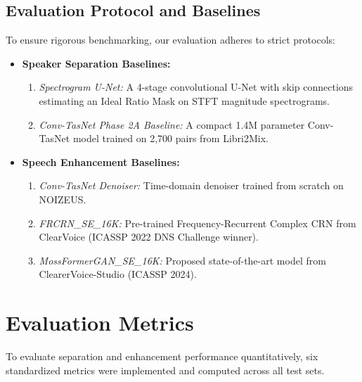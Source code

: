 \documentclass[11pt,a4paper]{report}
\begin{document}
\section{Evaluation Protocol and Baselines}
To ensure rigorous benchmarking, our evaluation adheres to strict protocols:
\begin{itemize}
    \item \textbf{Speaker Separation Baselines:}
    \begin{enumerate}
        \item \textit{Spectrogram U-Net:} A 4-stage convolutional U-Net with skip connections estimating an Ideal Ratio Mask on STFT magnitude spectrograms.
        \item \textit{Conv-TasNet Phase 2A Baseline:} A compact 1.4M parameter Conv-TasNet model trained on 2,700 pairs from Libri2Mix.
    \end{enumerate}
    \item \textbf{Speech Enhancement Baselines:}
    \begin{enumerate}
        \item \textit{Conv-TasNet Denoiser:} Time-domain denoiser trained from scratch on NOIZEUS.
        \item \textit{FRCRN\_SE\_16K:} Pre-trained Frequency-Recurrent Complex CRN from ClearVoice (ICASSP 2022 DNS Challenge winner).
        \item \textit{MossFormerGAN\_SE\_16K:} Proposed state-of-the-art model from ClearerVoice-Studio (ICASSP 2024).
    \end{enumerate}
\end{itemize}

\chapter{Evaluation Metrics}
\label{chap:metrics}

To evaluate separation and enhancement performance quantitatively, six standardized metrics were implemented and computed across all test sets.
\end{document}
